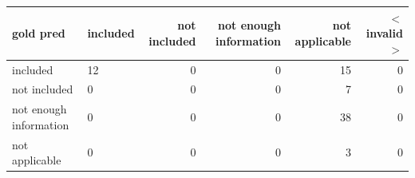\begin{tabular}{llrrrr}
\toprule
gold  pred & included & not included & not enough information & not applicable & $<$invalid$>$ \\
\midrule
included & 12 & 0 & 0 & 15 & 0 \\
not included & 0 & 0 & 0 & 7 & 0 \\
not enough information & 0 & 0 & 0 & 38 & 0 \\
not applicable & 0 & 0 & 0 & 3 & 0 \\
\bottomrule
\end{tabular}
